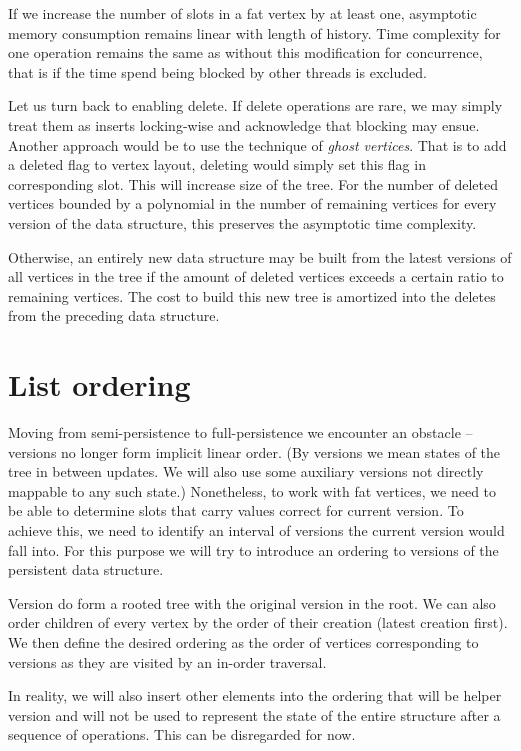 If we increase the number of slots in a fat vertex by at least one, asymptotic memory consumption remains linear with length of history. Time complexity for one operation remains the same as without this modification for concurrence, that is if the time spend being blocked by other threads is excluded.

Let us turn back to enabling delete. If delete operations are rare, we may simply treat them as inserts locking-wise and acknowledge that blocking may ensue. Another approach would be to use the technique of \textit{ghost vertices}. That is to add a deleted flag to vertex layout, deleting would simply set this flag in corresponding slot. This will increase size of the tree. For the number of deleted vertices bounded by a polynomial in the number of remaining vertices for every version of the data structure, this preserves the asymptotic time complexity. 

Otherwise, an entirely new data structure may be built from the latest versions of all vertices in the tree if the amount of deleted vertices exceeds a certain ratio to remaining vertices. The cost to build this new tree is amortized into the deletes from the preceding data structure.



\section{List ordering}

Moving from semi-persistence to full-persistence we encounter an obstacle -- versions no longer form implicit linear order. (By versions we mean states of the tree in between updates. We will also use some auxiliary versions not directly mappable to any such state.) Nonetheless, to work with fat vertices, we need to be able to determine slots that carry values correct for current version. To achieve this, we need to identify an interval of versions the current version would fall into. For this purpose we will try to introduce an ordering to versions of the persistent data structure.

Version do form a rooted tree with the original version in the root. We can also order children of every vertex by the order of their creation (latest creation first). We then define the desired ordering as the order of vertices corresponding to versions as they are visited by an in-order traversal. %

In reality, we will also insert other elements into the ordering that will be helper version and will not be used to represent the state of the entire structure after a sequence of operations. This can be disregarded for now.

